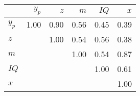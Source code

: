 \begin{tabular}{lrrrrr}
\hline
 & $y_{p}$  & $z$  & $m$  & $IQ$  & $x$  \\ 
\hline
$y_{p}$ & 1.00  & 0.90  & 0.56  & 0.45  & 0.39  \\ 
$z$ &   & 1.00  & 0.54  & 0.56  & 0.38  \\ 
$m$ &   &   & 1.00  & 0.54  & 0.87  \\ 
$IQ$ &   &   &   & 1.00  & 0.61  \\ 
$x$ &   &   &   &   & 1.00  \\ 
\hline
\end{tabular}%
